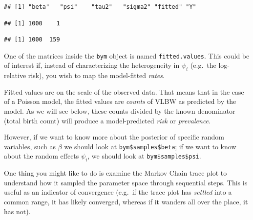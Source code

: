 \documentclass[
]{book}
\newenvironment{Shaded}{\begin{snugshade}}{\end{snugshade}}
\newcommand{\CommentTok}[1]{\textcolor[rgb]{0.56,0.35,0.01}{\textit{#1}}}
\newcommand{\FunctionTok}[1]{\textcolor[rgb]{0.00,0.00,0.00}{#1}}
\newcommand{\NormalTok}[1]{#1}
\newcommand{\SpecialCharTok}[1]{\textcolor[rgb]{0.00,0.00,0.00}{#1}}
\begin{document}
\begin{verbatim}
## [1] "beta"   "psi"    "tau2"   "sigma2" "fitted" "Y"
\end{verbatim}

\begin{Shaded}
\end{Shaded}

\begin{verbatim}
## [1] 1000    1
\end{verbatim}

\begin{Shaded}
\end{Shaded}

\begin{verbatim}
## [1] 1000  159
\end{verbatim}

One of the matrices inside the \texttt{bym} object is named \texttt{fitted.values}. This could be of interest if, instead of characterizing the heterogeneity in \(\psi_i\) (e.g.~the log-relative risk), you wish to map the model-fitted \emph{rates}.

Fitted values are on the scale of the observed data. That means that in the case of a Poisson model, the fitted values are \emph{counts} of VLBW as predicted by the model. As we will see below, these counts divided by the known denominator (total birth count) will produce a model-predicted \emph{risk} or \emph{prevalence}.

However, if we want to know more about the posterior of specific random variables, such as \(\beta\) we should look at \texttt{bym\$samples\$beta}; if we want to know about the random effects \(\psi_i\), we should look at \texttt{bym\$samples\$psi}.

One thing you might like to do is examine the Markov Chain trace plot to understand how it sampled the parameter space through sequential steps. This is useful as an indicator of convergence (e.g.~if the trace plot has \emph{settled} into a common range, it has likely converged, whereas if it wanders all over the place, it has not).
\end{document}

